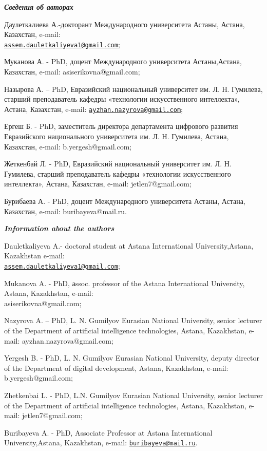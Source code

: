 \begin{authorinfo}
\emph{{\bfseries Сведения об авторах}}

Даулеткалиева А.-докторант Международного университета Астаны, Астана,
Казахстан, e-mail:\\
\href{mailto:assem.dauletkaliyeva1@gmail.com}{\nolinkurl{assem.dauletkaliyeva1@gmail.com}};

Муканова А. - PhD, доцент Международного университета Астаны,Астана,
Казахстан, e-mail: asiserikovna@gmail.com;

Назырова А. -- PhD, Евразийский национальный университет им. Л. Н.
Гумилева, старший преподаватель кафедры «технологии искусственного
интеллекта», Астана, Казахстан, e-mail:
\href{mailto:ayzhan.nazyrova@gmail.com}{\nolinkurl{ayzhan.nazyrova@gmail.com}};

Ергеш Б. - PhD, заместитель директора департамента цифрового развития
Евразийского национального университета им. Л. Н. Гумилева, Астана,
Казахстан, e-mail: b.yergesh@gmail.com;

Жеткенбай Л. - PhD, Евразийский национальный университет им. Л. Н.
Гумилева, старший преподаватель кафедры «технологии искусственного
интеллекта», Астана, Казахстан, e-mail: jetlen7@gmail.com;

Бурибаева А. - PhD, доцент Международного университета Астаны, Астана,
Казахстан, e-mail: buribayeva@mail.ru.

\emph{{\bfseries Information about the authors}}

Dauletkaliyeva A.- doctoral student at Astana International
University,Astana, Kazakhstan e-mail:\\
\href{mailto:assem.dauletkaliyeva1@gmail.com}{\nolinkurl{assem.dauletkaliyeva1@gmail.com}};

Mukanova A. - PhD, аssoc. professor of the Astana International
University, Astana, Kazakhstan, e-mail: \\asiserikovna@gmail.com;

Nazyrova A. -- PhD, L. N. Gumilyov Eurasian National University, senior
lecturer of the Department of artificial intelligence technologies,
Astana, Kazakhstan, e-mail: ayzhan.nazyrova@gmail.com;

Yergesh B. - PhD, L. N. Gumilyov Eurasian National University, deputy
director of the Department of digital development, Astana, Kazakhstan,
e-mail: b.yergesh@gmail.com;

Zhetkenbai L. - PhD, L.N. Gumilyov Eurasian National University, senior
lecturer of the Department of artificial intelligence technologies,
Astana, Kazakhstan, e-mail: jetlen7@gmail.com;

Buribayeva A. - PhD, Associate Professor at Astana International
University,Astana, Kazakhstan, e-mail:
\href{mailto:buribayeva@mail.ru}{\nolinkurl{buribayeva@mail.ru}}.\
\end{authorinfo}
